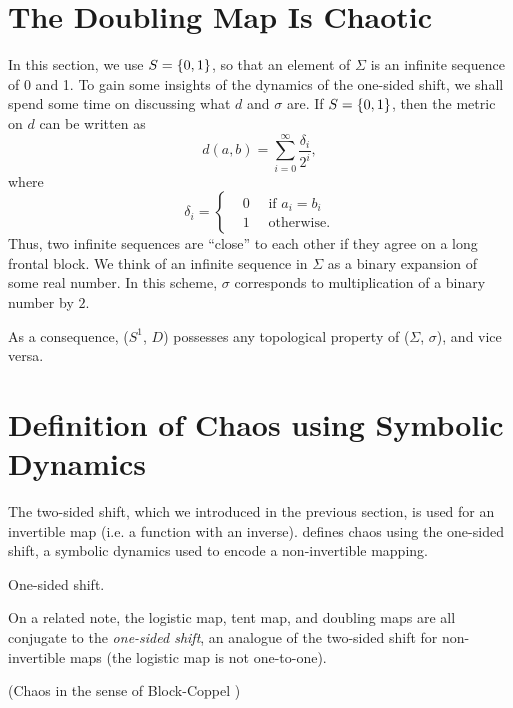 \documentclass[10pt,twoside]{book}
\begin{document}
\section{The Doubling Map Is Chaotic}
In this section, we use $S = \left \{ 0,1 \right \}$, so that an element of $\Sigma$ is an infinite sequence of 0 and 1.
To gain some insights of the dynamics of the one-sided shift, we shall spend some time on discussing what $d$ and $\sigma$ are.
If $S = \left \{ 0,1 \right \}$, then the metric on $d$ can be written as
\begin{equation*}
  d(a,b) = \sum\limits_{i = 0}^{\infty} \frac{\delta_{i}}{2^i},
\end{equation*}
where
\begin{equation*}
  \delta_i = 
  \begin{cases}
    &0 \quad \mbox{ if } a_i = b_i  \\
    &1 \quad \mbox{ otherwise.}
  \end{cases}
\end{equation*}
Thus, two infinite sequences are ``close'' to each other if they agree on a long frontal block.
We think of an infinite sequence in $\Sigma$ as a binary expansion of some real number.
In this scheme, $\sigma$ corresponds to multiplication of a binary number by $2$.

As a consequence, ($S^1 $, $D$) possesses any topological property of ($\Sigma$, $\sigma$), and vice versa.


\section{Definition of Chaos using Symbolic Dynamics}
The two-sided shift, which we introduced in the previous section, is used for an invertible map (i.e. a function with an inverse).
\citet{blockcoppel} defines chaos using the one-sided shift, a symbolic dynamics used to encode a non-invertible mapping.
\begin{definition}
  One-sided shift.
\end{definition}
On a related note, the logistic map, tent map, and doubling maps are all conjugate to the \textit{one-sided shift}, an analogue of the two-sided shift for non-invertible maps (the logistic map is not one-to-one).
\begin{definition}
  (Chaos in the sense of Block-Coppel \citep{blockcoppel})
  \label{defn:blockcoppel}
\end{definition}





\printindex
\end{document}
